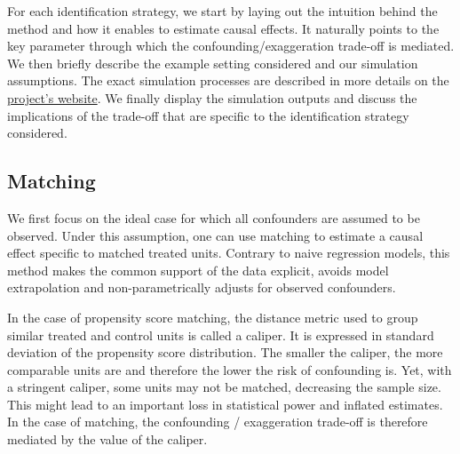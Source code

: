 \documentclass[12pt]{article}
\begin{document}
    
    For each identification strategy, we start by laying out the intuition behind the method and how it enables to estimate causal effects. It naturally points to the key parameter through which the confounding/exaggeration trade-off is mediated. We then briefly describe the example setting considered and our simulation assumptions. The exact simulation processes are described in more details on the \href{https://vincentbagilet.github.io/causal_inflation/}{project's website}. We finally display the simulation outputs and discuss the implications of the trade-off that are specific to the identification strategy considered. 
    
    \subsection{Matching}
		
		We first focus on the ideal case for which all confounders are assumed to be observed. Under this assumption, one can use matching to estimate a causal effect specific to matched treated units. Contrary to naive regression models, this method makes the common support of the data explicit, avoids model extrapolation and non-parametrically adjusts for observed confounders. 
		  
		In the case of propensity score matching, the distance metric used to group similar treated and control units is called a caliper. It is expressed in standard deviation of the propensity score distribution. The smaller the caliper, the more comparable units are and therefore the lower the risk of confounding is. Yet, with a stringent caliper, some units may not be matched, decreasing the sample size. This might lead to an important loss in statistical power and inflated estimates. In the case of matching, the confounding / exaggeration trade-off is therefore mediated by the value of the caliper.
                
\end{document}
